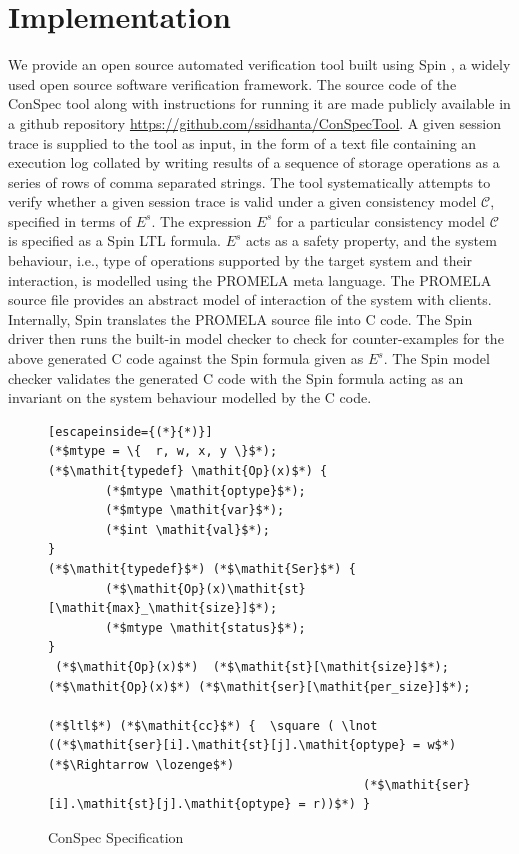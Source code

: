 \documentclass[journal,compsoc]{IEEEtran}
\begin{document}
   \section{Implementation}\label{sec:impl}
 We provide an open source automated verification tool built using Spin \cite{Holzmann:2003:SMC:1405716}, a widely used \cite{spinroot-success} open source software verification framework. The source code of the ConSpec tool along with instructions for running it are made publicly available in a github repository \url{https://github.com/ssidhanta/ConSpecTool}. A given session trace is supplied to the tool as input, in the form of a text file containing an execution log collated by writing results of a sequence of storage operations as a series of rows of comma separated strings. The tool systematically attempts to  verify whether a given session trace is valid under a given consistency model $\mathcal{C}$, specified in terms of  $E^s$.  The expression  $E^s$ for a particular consistency model $\mathcal{C}$ is specified as a Spin LTL formula.  $E^s$ acts as a safety property, and the system behaviour, i.e., type of operations supported by the target system and their interaction, is modelled using the PROMELA meta language. The PROMELA source file provides an abstract model of interaction of the system with clients.   
  Internally, Spin translates the PROMELA source file into C code. The Spin driver then runs the built-in model checker to check for counter-examples for the above generated C code  against  the Spin formula given as $E^s$.  The Spin model checker validates the generated C code with the Spin formula acting as an invariant on the system behaviour modelled by the C code. %
   \begin{figure}\caption{ConSpec Specification}\label{format:spec}
\begin{lstlisting}[escapeinside={(*}{*)}]
(*$mtype = \{  r, w, x, y \}$*);
(*$\mathit{typedef} \mathit{Op}(x)$*) {
		(*$mtype \mathit{optype}$*);
		(*$mtype \mathit{var}$*);
		(*$int \mathit{val}$*);
}
(*$\mathit{typedef}$*) (*$\mathit{Ser}$*) {
		(*$\mathit{Op}(x)\mathit{st}[\mathit{max}_\mathit{size}]$*);
		(*$mtype \mathit{status}$*);
}
 (*$\mathit{Op}(x)$*)  (*$\mathit{st}[\mathit{size}]$*);
(*$\mathit{Op}(x)$*) (*$\mathit{ser}[\mathit{per_size}]$*);

(*$ltl$*) (*$\mathit{cc}$*) {  \square ( \lnot ((*$\mathit{ser}[i].\mathit{st}[j].\mathit{optype} = w$*)  (*$\Rightarrow \lozenge$*) 
											(*$\mathit{ser}[i].\mathit{st}[j].\mathit{optype} = r))$*) }
\end{lstlisting}
\end{figure}
\end{document}
